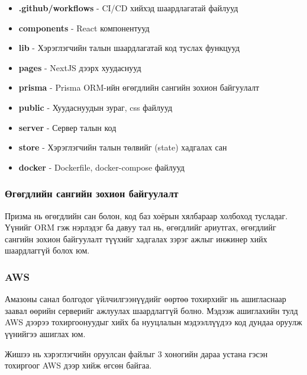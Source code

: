 \begin{itemize}
	\item \textbf{.github/workflows} - CI/CD хийхэд шаардлагатай файлууд
	\item \textbf{components} - React компонентууд
	\item \textbf{lib} - Хэрэглэгчийн талын шаардлагатай код туслах функцууд
	\item \textbf{pages} - NextJS дээрх хуудаснууд
	\item \textbf{prisma} - Prisma ORM-ийн өгөгдлийн сангийн зохион байгуулалт
	\item \textbf{public} - Хуудаснуудын зураг, css файлууд
	\item \textbf{server} - Сервер талын код
	\item \textbf{store} - Хэрэглэгчийн талын төлвийг (state) хадгалах сан
	\item \textbf{docker} - Dockerfile, docker-compose файлууд
\end{itemize}

\subsubsection{Өгөгдлийн сангийн зохион байгуулалт}
Призма нь өгөгдлийн сан болон, код баз хоёрын хялбараар холбоход тусладаг. Үүнийг ORM гэж нэрлэдэг ба давуу тал нь, өгөгдлийг ариутгах, өгөгдлийг сангийн зохион байгуулалт түүхийг хадгалах зэрэг ажлыг инжинер хийх шаардлаггүй болох юм.


\subsubsection{AWS}
Амазоны санал болгодог үйлчилгээнүүдийг өөртөө тохирхийг нь ашигласнаар заавал өөрийн серверийг ажлуулах шаардлаггүй болно. Мэдээж ашиглахийн тулд AWS дээрээ тохиргоонуудыг хийх ба нууцлалын мэдээллүүдээ код дундаа оруулж үүнийгээ ашиглах юм.

Жишээ нь хэрэглэгчийн оруулсан файлыг 3 хоногийн дараа устана гэсэн тохиргоог AWS дээр хийж өгсөн байгаа.





